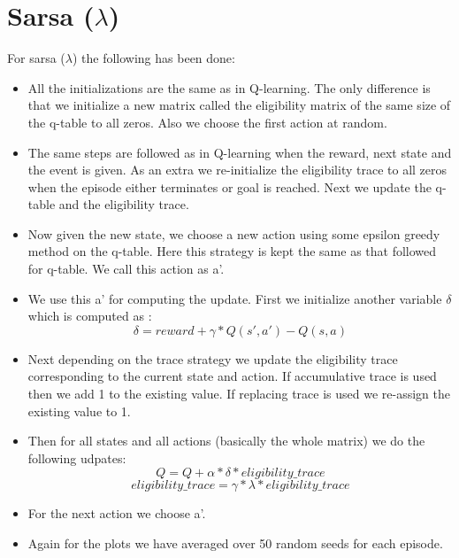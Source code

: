 \documentclass{article}
\begin{document}

\section{Sarsa ($\lambda$)}
For sarsa ($\lambda$) the following has been done:
\begin{itemize}
\item All the initializations are the same as in Q-learning. The only difference is that we initialize a new matrix called the eligibility matrix of the same size of the q-table to all zeros. Also we choose the first action at random.
\item The same steps are followed as in Q-learning when the reward, next state and the event is given. As an extra we re-initialize the eligibility trace to all zeros when the episode either terminates or goal is reached. Next we update the q-table and the eligibility trace.
\item Now given the new state, we choose a new action using some epsilon greedy method on the q-table. Here this strategy is kept the same as that followed for q-table. We call this action as a'.
\item We use this a' for computing the update. First we initialize another variable $\delta$ which is computed as :
  $$\delta = reward + \gamma * Q(s', a') - Q(s, a)$$
\item Next depending on the trace strategy we update the eligibility trace corresponding to the current state and action. If accumulative trace is used then we add 1 to the existing value. If replacing trace is used we re-assign the existing value to 1.
\item Then for all states and all actions (basically the whole matrix) we do the following udpates:
  $$Q = Q + \alpha * \delta * eligibility\_trace$$
  $$eligibility\_trace = \gamma * \lambda * eligibility\_trace$$
\item For the next action we choose a'.
\item Again for the plots we have averaged over 50 random seeds for each episode.
\end{itemize}
\end{document}
